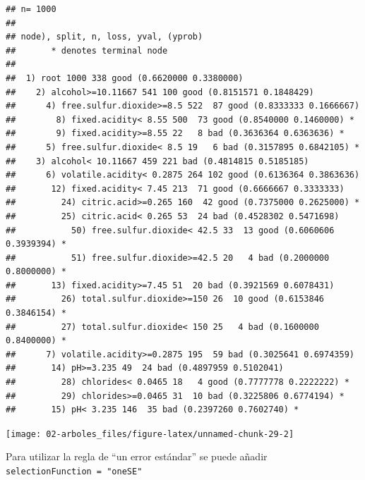 \documentclass[
]{book}
\newenvironment{Shaded}{\begin{snugshade}}{\end{snugshade}}
\newcommand{\AttributeTok}[1]{\textcolor[rgb]{0.77,0.63,0.00}{#1}}
\newcommand{\FunctionTok}[1]{\textcolor[rgb]{0.00,0.00,0.00}{#1}}
\newcommand{\NormalTok}[1]{#1}
\newcommand{\SpecialCharTok}[1]{\textcolor[rgb]{0.00,0.00,0.00}{#1}}
\newcommand{\StringTok}[1]{\textcolor[rgb]{0.31,0.60,0.02}{#1}}
\theoremstyle{break}
\theoremstyle{definition}
\theoremstyle{definition}
\theoremstyle{definition}
\theoremstyle{definition}
\theoremstyle{remark}
\begin{document}
\begin{verbatim}
## n= 1000 
## 
## node), split, n, loss, yval, (yprob)
##       * denotes terminal node
## 
##  1) root 1000 338 good (0.6620000 0.3380000)  
##    2) alcohol>=10.11667 541 100 good (0.8151571 0.1848429)  
##      4) free.sulfur.dioxide>=8.5 522  87 good (0.8333333 0.1666667)  
##        8) fixed.acidity< 8.55 500  73 good (0.8540000 0.1460000) *
##        9) fixed.acidity>=8.55 22   8 bad (0.3636364 0.6363636) *
##      5) free.sulfur.dioxide< 8.5 19   6 bad (0.3157895 0.6842105) *
##    3) alcohol< 10.11667 459 221 bad (0.4814815 0.5185185)  
##      6) volatile.acidity< 0.2875 264 102 good (0.6136364 0.3863636)  
##       12) fixed.acidity< 7.45 213  71 good (0.6666667 0.3333333)  
##         24) citric.acid>=0.265 160  42 good (0.7375000 0.2625000) *
##         25) citric.acid< 0.265 53  24 bad (0.4528302 0.5471698)  
##           50) free.sulfur.dioxide< 42.5 33  13 good (0.6060606 0.3939394) *
##           51) free.sulfur.dioxide>=42.5 20   4 bad (0.2000000 0.8000000) *
##       13) fixed.acidity>=7.45 51  20 bad (0.3921569 0.6078431)  
##         26) total.sulfur.dioxide>=150 26  10 good (0.6153846 0.3846154) *
##         27) total.sulfur.dioxide< 150 25   4 bad (0.1600000 0.8400000) *
##      7) volatile.acidity>=0.2875 195  59 bad (0.3025641 0.6974359)  
##       14) pH>=3.235 49  24 bad (0.4897959 0.5102041)  
##         28) chlorides< 0.0465 18   4 good (0.7777778 0.2222222) *
##         29) chlorides>=0.0465 31  10 bad (0.3225806 0.6774194) *
##       15) pH< 3.235 146  35 bad (0.2397260 0.7602740) *
\end{verbatim}

\begin{Shaded}
\end{Shaded}

\begin{center}\texttt{[image: 02-arboles\_files/figure-latex/unnamed-chunk-29-2]} \end{center}

Para utilizar la regla de ``un error estándar'' se puede añadir \texttt{selectionFunction\ =\ "oneSE"}
\end{document}
